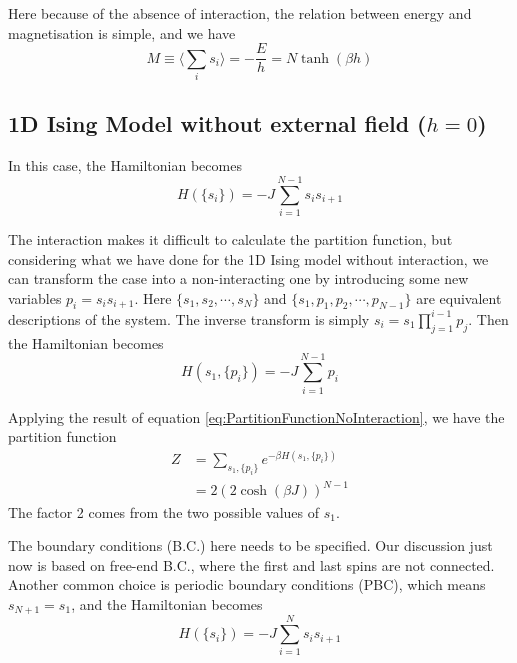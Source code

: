 \documentclass[11pt]{article}
\begin{document}
	Here because of the absence of interaction, the relation between energy and magnetisation is simple, and we have
	\begin{equation} \label{eq:MagnetisationNoInteraction}
		M \equiv \langle \sum_i s_i \rangle = -\frac{E}{h} = N \tanh(\beta h)
	\end{equation}

	\subsection{1D Ising Model without external field ($h=0$)}


	In this case, the Hamiltonian becomes
	\begin{equation} \label{eq:Hamiltonian1DNoField}
		H(\{s_i\}) = -J \sum_{i=1}^{N-1} s_i s_{i+1}
	\end{equation}

	The interaction makes it difficult to calculate the partition function, 
	but considering what we have done for the 1D Ising model without interaction, 
	we can transform the case into a non-interacting one by introducing some new variables $p_i = s_i s_{i+1}$.
	Here $\{s_1, s_2, \cdots, s_N\}$ and $\{s_1, p_1, p_2, \cdots, p_{N-1}\}$ are equivalent descriptions of the system.
	The inverse transform is simply $s_i = s_1 \prod_{j=1}^{i-1} p_j$.
	Then the Hamiltonian becomes
	\begin{equation} \label{eq:Hamiltonian1DNoFieldTransformed}
		H(s_1, \{p_i\}) = -J \sum_{i=1}^{N-1} p_i
	\end{equation}

	Applying the result of equation \ref{eq:PartitionFunctionNoInteraction}, we have the partition function
	\begin{equation} \label{eq:PartitionFunction1DNoField}
		\begin{aligned}
			Z &= \sum_{s_1, \{p_i\}} e^{-\beta H(s_1, \{p_i\})} \\
			&= 2(2\cosh(\beta J))^{N-1}
		\end{aligned}
	\end{equation}
	The factor 2 comes from the two possible values of $s_1$.

	The boundary conditions (B.C.) here needs to be specified.
	Our discussion just now is based on free-end B.C., where the first and last spins are not connected.
	Another common choice is periodic boundary conditions (PBC), which means $s_{N+1} = s_1$, and the Hamiltonian becomes
	\begin{equation} \label{eq:Hamiltonian1DNoFieldPeriodic}
		H(\{s_i\}) = -J \sum_{i=1}^{N} s_i s_{i+1}
	\end{equation}
\end{document}
